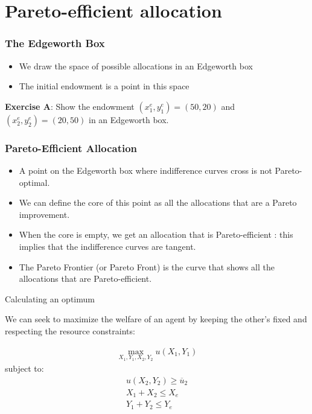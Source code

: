 \documentclass[handout]{beamer}
\begin{document}
\section{Pareto-efficient allocation}

\begin{frame}\frametitle{The Edgeworth Box} 

\begin{itemize}
    \item We draw the space of possible allocations in an Edgeworth box
    \item The initial endowment is a point in this space
\end{itemize}
 
\textbf{Exercise A}: Show the endowment $(x^e_1,y_1^e) = (50,20)$ and $(x^e_2,y_2^e)=(20,50)$ in an Edgeworth box.
\end{frame}


\begin{frame}\frametitle{Pareto-Efficient Allocation}
\begin{itemize}
    \item A point on the Edgeworth box where indifference curves cross is not Pareto-optimal. 
    \item We can define the core of this point as all the allocations that are a Pareto improvement. 
    \item When the core is empty, we get an allocation that is Pareto-efficient : this implies that the indifference curves are tangent.
    \item The Pareto Frontier (or Pareto Front) is the curve that shows all the allocations that are Pareto-efficient. 
\end{itemize}

\end{frame}

\begin{frame}{Calculating an optimum}

We can seek to maximize the welfare of an agent by keeping the other's fixed and respecting the resource constraints: 

\begin{eqnarray*}
\max_{X_1,Y_1,X_2,Y_2} u(X_1,Y_1) 
\end{eqnarray*}
subject to:
\begin{eqnarray*}
u(X_2,Y_2)\ge \overline{u}_2 \\
X_1 + X_2 \le X_e \\
Y_1 + Y_2 \le Y_e
\end{eqnarray*}

\end{frame}
\end{document}
